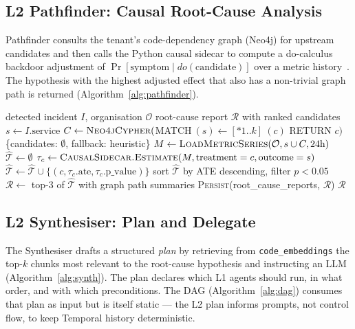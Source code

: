 \documentclass[manuscript,nonacm=true,screen=false,review=false]{acmart}
\begin{document}
\subsection{L2 Pathfinder: Causal Root-Cause Analysis}

Pathfinder consults the tenant's code-dependency graph (Neo4j) for upstream candidates and then calls the Python causal sidecar to compute a do-calculus backdoor adjustment of \(\Pr[\text{symptom} \mid do(\text{candidate})]\) over a metric history~\cite{pearl2009causality}. The hypothesis with the highest adjusted effect that also has a non-trivial graph path is returned (Algorithm~\ref{alg:pathfinder}).

\begin{algorithm}
\caption{L2 Pathfinder.Diagnose --- causal RCA on codegraph}\label{alg:pathfinder}
\begin{algorithmic}[1]
\Require detected incident $I$, organisation \(\mathcal{O}\)
\Ensure root-cause report $\mathcal{R}$ with ranked candidates
\State $s \gets I.\text{service}$
\State $C \gets \textsc{Neo4jCypher}($MATCH$\ (s)\leftarrow[\ast 1..k]\ (c)$ RETURN $c)$ 
 \State \Return \{candidates: $\emptyset$, fallback: heuristic\} \EndIf
\State $M \gets \textsc{LoadMetricSeries}(\mathcal{O}, s \cup C, 24\text{h})$
\State $\hat{\mathcal{T}} \gets \emptyset$
  \State $\tau_c \gets \textsc{CausalSidecar.Estimate}(M, \text{treatment}=c, \text{outcome}=s)$
  \State $\hat{\mathcal{T}} \gets \hat{\mathcal{T}} \cup \{(c, \tau_c.\text{ate}, \tau_c.\text{p\_value})\}$
\EndFor
\State sort $\hat{\mathcal{T}}$ by ATE descending, filter $p < 0.05$
\State $\mathcal{R} \gets$ top-$3$ of $\hat{\mathcal{T}}$ with graph path summaries
\State \textsc{Persist}(root\_cause\_reports, $\mathcal{R}$)
\State \Return $\mathcal{R}$
\end{algorithmic}
\end{algorithm}

\subsection{L2 Synthesiser: Plan and Delegate}

The Synthesiser drafts a structured \emph{plan} by retrieving from \texttt{code\_embeddings} the top-$k$ chunks most relevant to the root-cause hypothesis and instructing an LLM (Algorithm~\ref{alg:synth}). The plan declares which L1 agents should run, in what order, and with which preconditions. The DAG (Algorithm~\ref{alg:dag}) consumes that plan as input but is itself static --- the L2 plan informs prompts, not control flow, to keep Temporal history deterministic.
\end{document}
